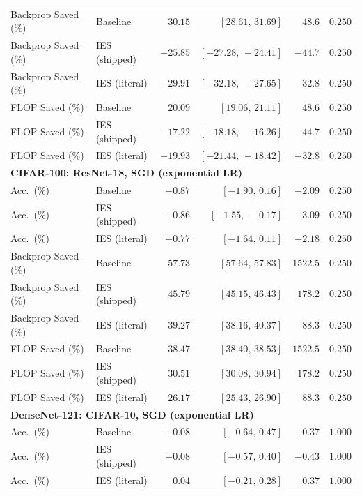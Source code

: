 \documentclass{article}
\newcommand{\win}[1]{\cellcolor{tgwin}#1}
\newcommand{\lose}[1]{\cellcolor{tglose}#1}
\theoremstyle{plain}
\theoremstyle{definition}
\theoremstyle{remark}
\begin{document}
\begin{longtable}{llrrrr}
Backprop Saved (\%) & Baseline & \win{$30.15$} & $[28.61,\,31.69]$ & $48.6$ & $0.250$ \\
Backprop Saved (\%) & IES (shipped) & \lose{$-25.85$} & $[-27.28,\,-24.41]$ & $-44.7$ & $0.250$ \\
Backprop Saved (\%) & IES (literal) & \lose{$-29.91$} & $[-32.18,\,-27.65]$ & $-32.8$ & $0.250$ \\
FLOP Saved (\%) & Baseline & \win{$20.09$} & $[19.06,\,21.11]$ & $48.6$ & $0.250$ \\
FLOP Saved (\%) & IES (shipped) & \lose{$-17.22$} & $[-18.18,\,-16.26]$ & $-44.7$ & $0.250$ \\
FLOP Saved (\%) & IES (literal) & \lose{$-19.93$} & $[-21.44,\,-18.42]$ & $-32.8$ & $0.250$ \\
\midrule
\multicolumn{6}{l}{\textbf{CIFAR-100: ResNet-18, SGD (exponential LR)}} \\
\midrule
Acc.\ (\%) & Baseline & \lose{$-0.87$} & $[-1.90,\,0.16]$ & $-2.09$ & $0.250$ \\
Acc.\ (\%) & IES (shipped) & \lose{$-0.86$} & $[-1.55,\,-0.17]$ & $-3.09$ & $0.250$ \\
Acc.\ (\%) & IES (literal) & \lose{$-0.77$} & $[-1.64,\,0.11]$ & $-2.18$ & $0.250$ \\
Backprop Saved (\%) & Baseline & \win{$57.73$} & $[57.64,\,57.83]$ & $1522.5$ & $0.250$ \\
Backprop Saved (\%) & IES (shipped) & \win{$45.79$} & $[45.15,\,46.43]$ & $178.2$ & $0.250$ \\
Backprop Saved (\%) & IES (literal) & \win{$39.27$} & $[38.16,\,40.37]$ & $88.3$ & $0.250$ \\
FLOP Saved (\%) & Baseline & \win{$38.47$} & $[38.40,\,38.53]$ & $1522.5$ & $0.250$ \\
FLOP Saved (\%) & IES (shipped) & \win{$30.51$} & $[30.08,\,30.94]$ & $178.2$ & $0.250$ \\
FLOP Saved (\%) & IES (literal) & \win{$26.17$} & $[25.43,\,26.90]$ & $88.3$ & $0.250$ \\
\midrule
\multicolumn{6}{l}{\textbf{DenseNet-121: CIFAR-10, SGD (exponential LR)}} \\
\midrule
Acc.\ (\%) & Baseline & \lose{$-0.08$} & $[-0.64,\,0.47]$ & $-0.37$ & $1.000$ \\
Acc.\ (\%) & IES (shipped) & \lose{$-0.08$} & $[-0.57,\,0.40]$ & $-0.43$ & $1.000$ \\
Acc.\ (\%) & IES (literal) & \win{$0.04$} & $[-0.21,\,0.28]$ & $0.37$ & $1.000$ \\

\end{longtable}
\end{document}
